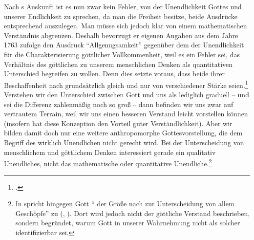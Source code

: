 Nach s Auskunft ist es nun zwar kein Fehler, von der
Unendlichkeit Gottes und unserer Endlichkeit zu sprechen, da man die Freiheit besitze, beide Ausdrücke
entsprechend auszulegen. Man müsse sich jedoch klar von einem mathematischen
Verständnis abgrenzen. Deshalb bevorzugt er eigenen Angaben aus dem Jahre 1763
zufolge den Ausdruck
\label{Allgenugsamkeit}\enquote{Allgenugsamkeit} gegenüber dem
der Unendlichkeit für die Charakterisierung göttlicher Vollkommenheit,
weil es ein Fehler sei, das Verhältnis des göttlichen zu unserem
menschlichen Denken als quantitativen Unterschied begreifen zu wollen.
Denn dies setzte voraus, dass beide ihrer Beschaffenheit nach grundsätzlich
gleich und nur von verschiedener Stärke seien.\footnote{\cite[Vgl.][A
186\,f.,]{Kant:DereinzigmoeglicheBeweisgrundvomDaseinGottes1977} \cite[][II:
154.4--19]{Kant:GesammelteWerke1900ff.}.}
Verstehen wir den Unterschied zwischen Gott und uns als lediglich graduell --
und sei die Differenz zahlenmäßig noch so groß -- dann befinden wir uns zwar auf
vertrautem Terrain, weil wir uns einen besseren Verstand leicht vorstellen
können (insofern hat diese Konzeption den Vorteil guter Verständlichkeit). Aber
wir bilden damit doch nur eine weitere anthropomorphe Gottesvorstellung, die dem
Begriff des wirklich Unendlichen nicht gerecht wird. Bei der Unterscheidung von
menschlichem und göttlichem Denken interessiert gerade ein qualitativ
Unendliches, nicht das mathematische oder quantitative Unendliche.\footnote{In
 spricht 
hingegen Gott \enquote{ der Größe nach
zur Unterscheidung von allem Geschöpfe} zu \mkbibparens{\cite[][A
322]{Kant:Washeisst:SichimDenkenorientieren?1977}, \cite[][VIII:
142.30]{Kant:GesammelteWerke1900ff.}}. Dort wird jedoch nicht der göttliche
Verstand beschrieben, sondern begründet, warum Gott in unserer Wahrnehmung nicht
als solcher identifizierbar sei.}

